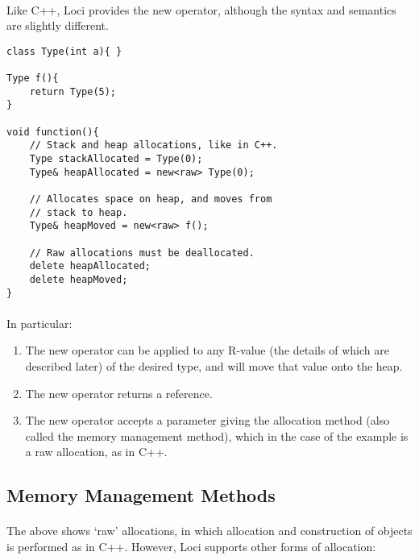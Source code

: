 \documentclass[12pt,twoside,notitlepage]{report}
\begin{document}
\paragraph{}
Like C++, Loci provides the new operator, although the syntax and semantics are slightly different.

\small{
\begin{verbatim}
class Type(int a){ }

Type f(){
    return Type(5);
}

void function(){
    // Stack and heap allocations, like in C++.
    Type stackAllocated = Type(0);
    Type& heapAllocated = new<raw> Type(0);
    
    // Allocates space on heap, and moves from
    // stack to heap.
    Type& heapMoved = new<raw> f();
    
    // Raw allocations must be deallocated.
    delete heapAllocated;
    delete heapMoved;
}
\end{verbatim}
}

\paragraph{}
In particular:

\begin{enumerate}
\item The new operator can be applied to any R-value (the details of which are described later) of the desired type, and will move that value onto the heap.
\item The new operator returns a reference.
\item The new operator accepts a parameter giving the allocation method (also called the memory management method), which in the case of the example is a raw allocation, as in C++.
\end{enumerate}

\subsection{Memory Management Methods}

\paragraph{}
The above shows `raw' allocations, in which allocation and construction of objects is performed as in C++. However, Loci supports other forms of allocation:
\end{document}
